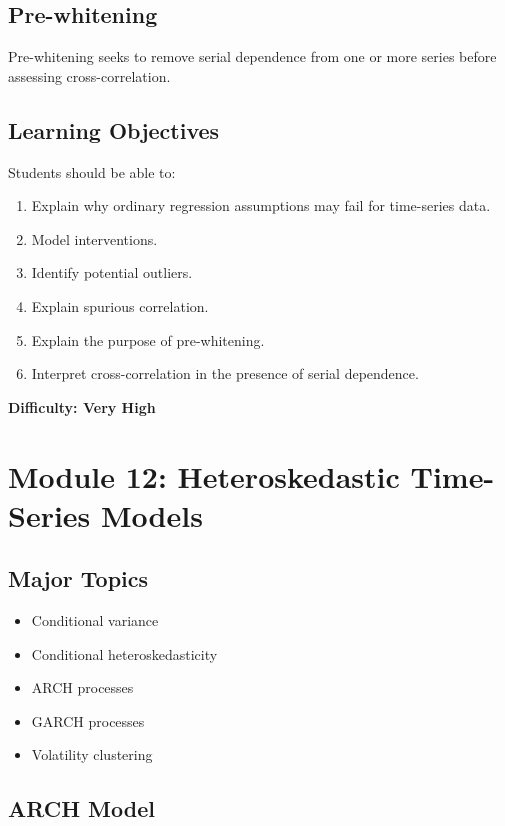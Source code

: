 \documentclass[11pt]{article}
\begin{document}
\subsection{Pre-whitening}

Pre-whitening seeks to remove serial dependence from one or more
series before assessing cross-correlation.

\subsection{Learning Objectives}

Students should be able to:

\begin{enumerate}
    \item Explain why ordinary regression assumptions may fail for
          time-series data.
    \item Model interventions.
    \item Identify potential outliers.
    \item Explain spurious correlation.
    \item Explain the purpose of pre-whitening.
    \item Interpret cross-correlation in the presence of serial dependence.
\end{enumerate}

\textbf{Difficulty: Very High}

\section{Module 12: Heteroskedastic Time-Series Models}

\subsection{Major Topics}

\begin{itemize}
    \item Conditional variance
    \item Conditional heteroskedasticity
    \item ARCH processes
    \item GARCH processes
    \item Volatility clustering
\end{itemize}

\subsection{ARCH Model}
\end{document}
